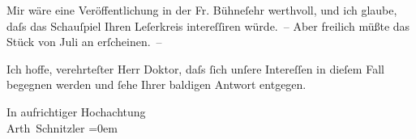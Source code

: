 \pstart
           Mir wäre eine Veröffentlichung in der Fr. Bühneſehr werthvoll, und ich glaube, daſs das Schauſpiel
               Ihren Leſerkreis intereſſiren {\pb}würde. – Aber freilich müßte
               das Stück von Juli an erſcheinen. –\pend
           
\pstart
           Ich hoffe, verehrteſter Herr Doktor, daſs{ }ſich unſere Intereſſen in dieſem Fall
               begegnen werden und{ }ſehe Ihrer baldigen Antwort entgegen.\pend
           
\pstart
           In aufrichtiger Hochachtung{\\[\baselineskip]}\spacefill\mbox{Arth Schnitzler}\pend
           \leftskip=0em{}\endnumbering{}  
      